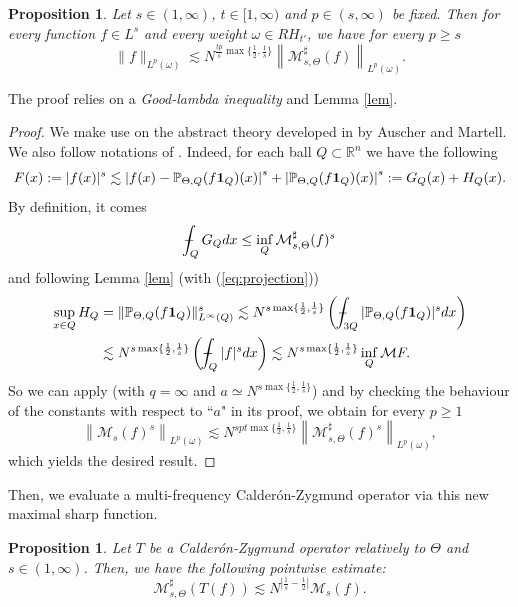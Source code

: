 \documentclass[11pt]{amsart}
\newtheorem{proposition}[theorem]{Proposition}
\theoremstyle{remark}
\newcommand{\rn}{\mathbb{R}^n}
\newcommand{\M}{{\mathcal M}}
\newcommand{\pr}{{\mathbb P}}
\def\Xint#1{\mathchoice
   {\XXint\displaystyle\textstyle{#1}}%
   {\XXint\textstyle\scriptstyle{#1}}%
   {\XXint\scriptstyle\scriptscriptstyle{#1}}%
   {\XXint\scriptscriptstyle\scriptscriptstyle{#1}}%
   \!\int}
\def\XXint#1#2#3{{\setbox0=\hbox{$#1{#2#3}{\int}$}
     \vcenter{\hbox{$#2#3$}}\kern-.5\wd0}}
\def\aver#1{\Xint-_{#1}}
\begin{document}
\begin{proposition} \label{prop:FeffermanStein} Let $s\in(1,\infty)$, $t\in[1,\infty)$ and $p \in(s,\infty)$ be fixed. Then for every function $f\in L^s$ and every weight $\omega\in RH_{t'}$, we have for every $p\geq s$
$$ \|f\|_{L^p(\omega)} \lesssim N^{\frac{tp}{s}\max\{\frac{1}{2},\frac{1}{s}\}} \left\| \M_{s,\Theta}^\sharp(f) \right\|_{L^p(\omega)}.$$
\end{proposition}

The proof relies on a {\it Good-lambda inequality} and Lemma \ref{lem}.

\begin{proof} We make use on the abstract theory developed in \cite{AM} by Auscher and Martell.
We also follow notations of \cite[Theorem 3.1]{AM}. Indeed, for each ball $Q\subset \rn$ we have the following 
 $$ F(x) := |f(x)|^s \lesssim \left|f(x)-\pr_{\Theta,Q}(f{\bf 1}_Q)(x) \right|^s + \left|\pr_{\Theta,Q}(f{\bf 1}_Q)(x) \right|^s := G_Q(x)+H_Q(x).
$$ 
 By definition, it comes
 $$ \aver{Q} G_Q dx \leq \inf _{Q} \M_{s,\Theta}^\sharp (f)^s$$
 and following Lemma \ref{lem} (with (\ref{eq:projection}))
 \begin{align*}
  \sup_{x\in Q} H_Q & = \|\pr_{\Theta,Q}(f {\bf 1}_Q)\|_{L^\infty(Q)}^s \lesssim N^{s\max\{\frac{1}{2},\frac{1}{s}\}} \left( \aver{3Q} |\pr_{\Theta,Q}(f {\bf 1}_Q)|^s dx\right) \\
  & \lesssim N^{s\max\{\frac{1}{2},\frac{1}{s}\}} \left( \aver{Q} |f|^s dx\right) \lesssim  N^{s\max\{\frac{1}{2},\frac{1}{s}\}} \inf_Q {\mathcal M} F.
  \end{align*}
 So we can apply \cite[Theorem 3.1]{AM} (with $q=\infty$ and $a\simeq N^{s\max\{\frac{1}{2},\frac{1}{s}\}}$) and by checking the behaviour of the constants with respect to ``$a$" in its proof, we obtain for every $p\geq 1$
 $$ \left\| {\mathcal M}_s(f)^s \right\|_{L^p(\omega)} \lesssim N^{spt \max\{\frac{1}{2},\frac{1}{s}\}} \left\| \M_{s,\Theta}^\sharp (f)^s \right\|_{L^p(\omega)},$$
 which yields the desired result.
\end{proof}

Then, we evaluate a multi-frequency Calder\'on-Zygmund operator via this new maximal sharp function.

\begin{proposition} \label{prop:maximal} Let $T$ be a Calder\'on-Zygmund operator relatively to $\Theta$ and $s\in(1,\infty)$. Then, we have the following pointwise estimate:
$$  \M_{s,\Theta}^\sharp (T(f)) \lesssim N^{|\frac{1}{s}-\frac{1}{2}|} {\mathcal M}_s(f) .$$
\end{proposition}
\end{document}
